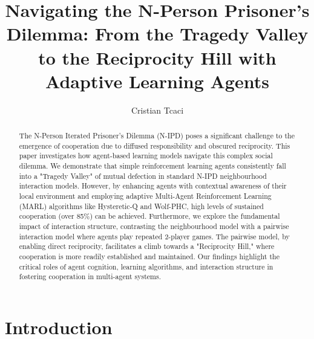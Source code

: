 \documentclass[]{llncs} %
\begin{document}
\title{Navigating the N-Person Prisoner's Dilemma: From the Tragedy Valley to the Reciprocity Hill with Adaptive Learning Agents}

\author{Cristian Tcaci}

\maketitle              

\begin{abstract}
The N-Person Iterated Prisoner's Dilemma (N-IPD) poses a significant challenge to the emergence of cooperation due to diffused responsibility and obscured reciprocity. This paper investigates how agent-based learning models navigate this complex social dilemma. We demonstrate that simple reinforcement learning agents consistently fall into a "Tragedy Valley" of mutual defection in standard N-IPD neighbourhood interaction models. However, by enhancing agents with contextual awareness of their local environment and employing adaptive Multi-Agent Reinforcement Learning (MARL) algorithms like Hysteretic-Q and Wolf-PHC, high levels of sustained cooperation (over 85\%) can be achieved. Furthermore, we explore the fundamental impact of interaction structure, contrasting the neighbourhood model with a pairwise interaction model where agents play repeated 2-player games. The pairwise model, by enabling direct reciprocity, facilitates a climb towards a "Reciprocity Hill," where cooperation is more readily established and maintained. Our findings highlight the critical roles of agent cognition, learning algorithms, and interaction structure in fostering cooperation in multi-agent systems.

\end{abstract}

\section{Introduction}
\label{sec:introduction}
\end{document}
